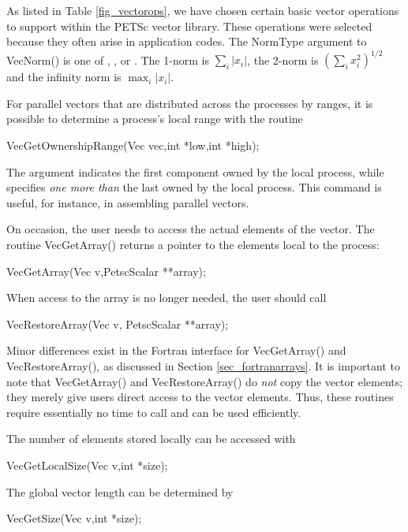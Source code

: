 As listed in Table \ref{fig_vectorops}, we have chosen certain 
basic vector operations to support within the PETSc vector library.
These operations were selected because they often arise in application 
codes. The NormType argument to VecNorm() is one of 
 , , or .
   
  The 1-norm is 
$ \sum_i |x_{i}|$, the 2-norm is $( \sum_{i} x_{i}^{2})^{1/2} $ and the 
infinity norm is $ \max_{i} |x_{i}|$. 


For parallel vectors that are distributed across the processes by ranges, 
it is possible to determine 
a process's local range with the routine
\begin{tabbing}
  VecGetOwnershipRange(Vec vec,int *low,int *high);
\end{tabbing}
The argument  indicates the first component owned by the local 
process, while  specifies {\em one more than} the 
last owned by the local process.
This command is useful, for instance, in assembling parallel vectors.

On occasion, the user needs to access the actual elements of the vector. 
The routine VecGetArray() 
returns a pointer to the elements local to the process:
\begin{tabbing}
  VecGetArray(Vec v,PetscScalar **array);
\end{tabbing}
When access to the array is no longer
needed, the user should call
\begin{tabbing}
  VecRestoreArray(Vec v, PetscScalar **array);
\end{tabbing}
Minor differences exist in the Fortran interface for VecGetArray() and 
VecRestoreArray(), as discussed in Section \ref{sec_fortranarrays}.  
It is important to note that VecGetArray() and VecRestoreArray()
do {\em not} copy the vector elements; they merely give users direct
access to the vector elements. Thus, these routines require essentially
no time to call and can be used efficiently.

The number of elements stored locally can be accessed with
\begin{tabbing}
  VecGetLocalSize(Vec v,int *size);
\end{tabbing}
The global vector length can be determined by 
\begin{tabbing}
  VecGetSize(Vec v,int *size);
\end{tabbing}


